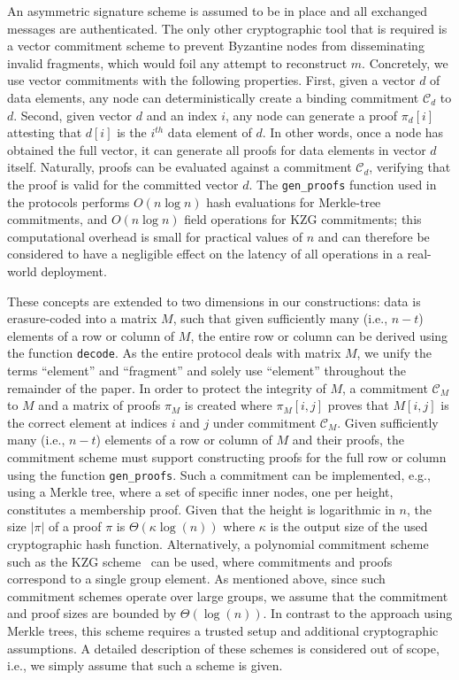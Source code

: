 \documentclass[sigconf,screen]{acmart}
\begin{document}
An asymmetric signature scheme is assumed to be in place and all exchanged messages are authenticated. The only other cryptographic tool that is required is a vector commitment scheme to prevent Byzantine nodes from disseminating invalid fragments, which would foil any attempt to reconstruct $m$. Concretely, we use vector commitments with the following properties. First, given a vector $d$ of data elements, any node can deterministically create a binding commitment $\mathcal{C}_d$ to $d$. Second, given vector $d$ and an index $i$, any node can generate a proof $\pi_d[i]$ attesting that $d[i]$ is the $i^\mathit{th}$ data element of $d$.
In other words, once a node has obtained the full vector, it can generate all proofs for data elements in vector $d$ itself.
Naturally, proofs can be evaluated against a commitment $\mathcal{C}_d$, verifying that the proof is valid for the committed vector $d$.
The \texttt{gen\_proofs} function used in the protocols performs $O(n\log n)$ hash evaluations for Merkle-tree commitments, and $O(n\log n)$ field operations for KZG commitments; this computational overhead is small for practical values of $n$ and can therefore be considered to have a negligible effect on the latency of all operations in a real-world deployment.
 
These concepts are extended to two dimensions in our constructions: data is erasure-coded into a matrix $M$, such that given sufficiently many (i.e., $n-t$) elements of a row or column of $M$, the entire row or column can be derived using the function \texttt{decode}.
As the entire protocol deals with matrix $M$, we unify the terms ``element'' and ``fragment'' and solely use ``element'' throughout the remainder of the paper.
In order to protect the integrity of $M$, a commitment $\mathcal{C}_M$ to $M$ and a matrix of proofs $\pi_M$ is created where $\pi_M[i,j]$ proves that $M[i,j]$ is the correct element at indices $i$ and $j$ under commitment $\mathcal{C}_M$. Given sufficiently many (i.e., $n-t$) elements of a row or column of $M$ and their proofs, the commitment scheme must support constructing proofs for the full row or column using the function \texttt{gen\_proofs}.
Such a commitment can be implemented, e.g., using a Merkle tree, where a set of specific inner nodes, one per height, constitutes a membership proof. Given that the height is logarithmic in $n$, the size $|\pi|$ of a proof $\pi$ is $\Theta(\kappa\log(n))$ where $\kappa$ is the output size of the used cryptographic hash function. Alternatively, a polynomial commitment scheme such as the KZG scheme~\cite{kate2010} can be used, where commitments and proofs correspond to a single group element. As mentioned above, since such commitment schemes operate over large groups, we assume that the commitment and proof sizes are bounded by $\Theta(\log(n))$.
In contrast to the approach using Merkle trees, this scheme requires a trusted setup and additional cryptographic assumptions. A detailed description of these schemes is considered out of scope, i.e., we simply assume that such a scheme is given.
\end{document}
